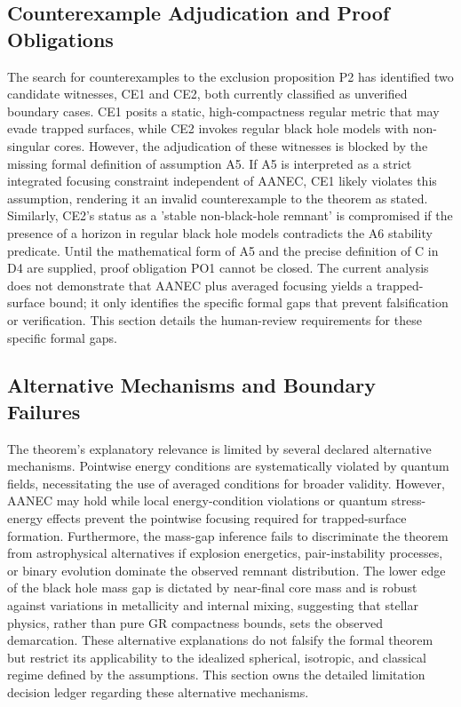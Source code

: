 \documentclass[conference]{IEEEtran}
\begin{document}
\subsection{Counterexample Adjudication and Proof Obligations}
The search for counterexamples to the exclusion proposition P2 has identified two candidate witnesses, CE1 and CE2, both currently classified as unverified boundary cases. CE1 posits a static, high-compactness regular metric that may evade trapped surfaces, while CE2 invokes regular black hole models with non-singular cores. However, the adjudication of these witnesses is blocked by the missing formal definition of assumption A5. If A5 is interpreted as a strict integrated focusing constraint independent of AANEC, CE1 likely violates this assumption, rendering it an invalid counterexample to the theorem as stated. Similarly, CE2's status as a 'stable non-black-hole remnant' is compromised if the presence of a horizon in regular black hole models contradicts the A6 stability predicate. Until the mathematical form of A5 and the precise definition of C in D4 are supplied, proof obligation PO1 cannot be closed. The current analysis does not demonstrate that AANEC plus averaged focusing yields a trapped-surface bound; it only identifies the specific formal gaps that prevent falsification or verification. This section details the human-review requirements for these specific formal gaps.

\subsection{Alternative Mechanisms and Boundary Failures}
The theorem's explanatory relevance is limited by several declared alternative mechanisms. Pointwise energy conditions are systematically violated by quantum fields, necessitating the use of averaged conditions for broader validity. However, AANEC may hold while local energy-condition violations or quantum stress-energy effects prevent the pointwise focusing required for trapped-surface formation. Furthermore, the mass-gap inference fails to discriminate the theorem from astrophysical alternatives if explosion energetics, pair-instability processes, or binary evolution dominate the observed remnant distribution. The lower edge of the black hole mass gap is dictated by near-final core mass and is robust against variations in metallicity and internal mixing, suggesting that stellar physics, rather than pure GR compactness bounds, sets the observed demarcation. These alternative explanations do not falsify the formal theorem but restrict its applicability to the idealized spherical, isotropic, and classical regime defined by the assumptions. This section owns the detailed limitation decision ledger regarding these alternative mechanisms.~\cite{cite_0ed84243cf171bc4,cite_7a407c865faafd11,cite_789b47fb0241d9ae}
\end{document}
